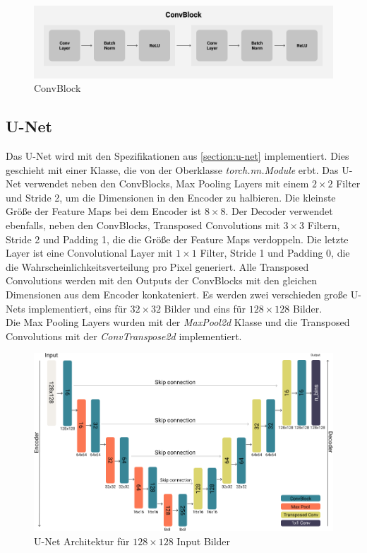 \begin{figure}[H]
  \centering
  \includegraphics[width=1\textwidth]{resources/networks/convblock.png}
  \caption{ConvBlock}
  \label{image:convBlock}
\end{figure}

\subsection{U-Net}
Das U-Net wird mit den Spezifikationen aus \ref{section:u-net} implementiert. Dies geschieht mit einer Klasse, die von der Oberklasse
\textit{torch.nn.Module} erbt. Das U-Net verwendet neben den ConvBlocks, Max Pooling Layers mit einem $2 \times 2$ Filter und Stride 2,
um die Dimensionen in den Encoder zu halbieren. Die kleinste Größe der Feature Maps bei dem Encoder ist $8 \times 8$. 
Der Decoder verwendet ebenfalls, neben den ConvBlocks, Transposed Convolutions mit $3 \times 3$ 
Filtern, Stride 2 und Padding 1, die die Größe der Feature Maps verdoppeln. Die letzte Layer ist eine Convolutional Layer mit $1 \times 1$ Filter, 
Stride 1 und Padding 0, die die
Wahrscheinlichkeitsverteilung pro Pixel generiert. Alle Transposed Convolutions werden mit den Outputs der ConvBlocks mit den gleichen
Dimensionen aus dem Encoder konkateniert. 
Es werden zwei verschieden große U-Nets implementiert, eins für $32 \times 32$ Bilder und eins für 
$128 \times 128$ Bilder.
\\
Die Max Pooling Layers wurden mit der \textit{MaxPool2d} Klasse und die Transposed Convolutions mit der \textit{ConvTranspose2d} implementiert.

\begin{figure}[H]
  \centering
  \includegraphics[width=1\textwidth]{resources/networks/128u-net.png}
  \caption{U-Net Architektur für $128 \times 128$ Input Bilder}
  \label{image:128u-net}
\end{figure}